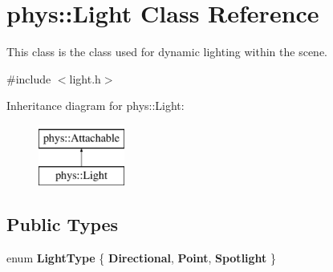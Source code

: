 \hypertarget{classphys_1_1Light}{
\section{phys::Light Class Reference}
\label{dc/df1/classphys_1_1Light}
}


This class is the class used for dynamic lighting within the scene.  




{\ttfamily \#include $<$light.h$>$}

Inheritance diagram for phys::Light:\begin{figure}[H]
\begin{center}
\leavevmode
\includegraphics[height=2.000000cm]{dc/df1/classphys_1_1Light}
\end{center}
\end{figure}
\subsection*{Public Types}
\begin{DoxyCompactItemize}
\item 
enum {\bfseries LightType} \{ {\bfseries Directional}, 
{\bfseries Point}, 
{\bfseries Spotlight}
 \}
\end{DoxyCompactItemize}
